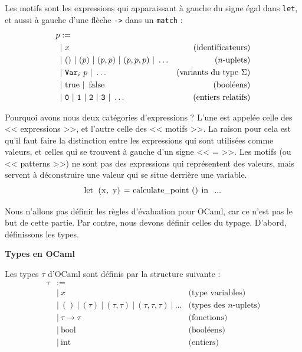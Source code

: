 \documentclass[11pt]{article}
\begin{document}
\begin{definition}
    Les motifs sont les expressions qui apparaissant à gauche du signe égal dans \lstinline|let|, et aussi à gauche d'une flèche \verb|->| dans un \lstinline|match| :
    \begin{equation*}
    \begin{aligned}
        p &:=\\
        &|~x&\text{(identificateurs)}\\
        &|~()~|~(p)~|~(p, p)~|~(p, p, p)~|~\dots&\text{($n$-uplets)}\\
        &|~\verb|Var|_i~p~|~\dots&\text{(variants  du type $\Sigma$)}\\
        &|~\text{\lstinline|true|}~|~\text{\lstinline|false|}&\text{(booléens)}\\
        &|~\verb|0|~|~\verb|1|~|~\verb|2|~|~\verb|3|~|~\dots&\text{(entiers relatifs)}\\
    \end{aligned}
    \end{equation*}
\end{definition}

Pourquoi avons nous deux catégories d'expressions ? L'une est appelée celle des << expressions >>, et l'autre celle des << motifs >>. La raison pour cela est qu'il faut faire la distinction entre les expressions qui sont utilisées comme valeurs, et celles qui se trouvent à gauche d'un signe << = >>. Les motifs (ou << patterns >>) ne sont pas des expressions qui représentent des valeurs, mais servent à déconstruire une valeur qui se situe derrière une variable.
$$\text{\lstinline|let (x, y) = calculate_point () in ...|}$$

Nous n'allons pas définir les règles d'évaluation pour OCaml, car ce n'est pas le but de cette partie. Par contre, nous devons définir celles du typage. D'abord, définissons les types.

\begin{definition}
    \textbf{Types en OCaml}

    Les types $\tau$ d'OCaml sont définis par la structure suivante :
    \begin{equation*}
    \begin{aligned}
        \tau &:=\\
        &|~x&\text{(type variables)}\\
        &|~()~|~(\tau)~|~(\tau, \tau)~|~(\tau, \tau, \tau)~|~\dots&\text{(types des $n$-uplets)}\\
        &|~\tau\to\tau&\text{(fonctions)}\\
        &|~\text{bool}&\text{(booléens)}\\
        &|~\text{int}&\text{(entiers)}\\
    \end{aligned}
    \end{equation*}
\end{definition}
\end{document}
